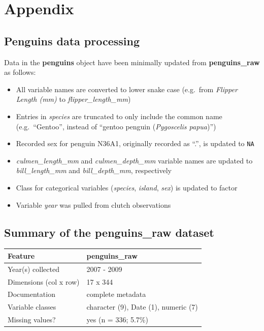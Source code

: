 \hypertarget{appendix}{%
\section*{Appendix}\label{appendix}}

\hypertarget{penguins-data-processing}{%
\subsection{Penguins data processing}\label{penguins-data-processing}}

Data in the \textbf{penguins} object have been minimally updated from
\textbf{penguins\_raw} as follows:

\begin{itemize}
\tightlist
\item
  All variable names are converted to lower snake case (e.g.~from
  \emph{Flipper Length (mm)} to \emph{flipper\_length\_mm})
\item
  Entries in \emph{species} are truncated to only include the common
  name (e.g.~``Gentoo'', instead of ``gentoo penguin (\emph{Pygoscelis
  papua})'')
\item
  Recorded sex for penguin N36A1, originally recorded as ``.'', is
  updated to \texttt{NA}
\item
  \emph{culmen\_length\_mm} and \emph{culmen\_depth\_mm} variable names
  are updated to \emph{bill\_length\_mm} and \emph{bill\_depth\_mm},
  respectively
\item
  Class for categorical variables (\emph{species}, \emph{island},
  \emph{sex}) is updated to factor
\item
  Variable \emph{year} was pulled from clutch observations
\end{itemize}

\hypertarget{summary-of-the-penguins_raw-dataset}{%
\subsection{\texorpdfstring{Summary of the \textbf{penguins\_raw}
dataset}{Summary of the penguins\_raw dataset}}\label{summary-of-the-penguins_raw-dataset}}

\begin{Schunk}

\begin{tabular}{ll}
\toprule
Feature & penguins\_raw\\
\midrule
Year(s) collected & 2007 - 2009\\
Dimensions (col x row) & 17 x 344\\
Documentation & complete metadata\\
Variable classes & character (9), Date (1), numeric (7)\\
Missing values? & yes (n = 336; 5.7\%)\\
\bottomrule
\end{tabular}

\end{Schunk}

